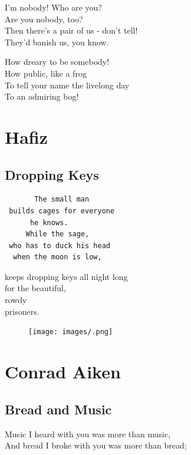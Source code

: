 \documentclass[]{book}
\renewenvironment{quote}{\begin{VF}}{\end{VF}}
\begin{document}
\begin{quote}
I'm nobody! Who are you?\\
Are you nobody, too?\\
Then there's a pair of us - don't tell!\\
They'd banish us, you know.

How dreary to be somebody!\\
How public, like a frog\\
To tell your name the livelong day\\
To an admiring bog!
\end{quote}

\chapter{Hafiz}\label{hafiz}

\section{Dropping Keys}\label{dropping-keys}

\begin{quote}
\begin{verbatim}
       The small man    
 builds cages for everyone    
      he knows.    
     While the sage,  
 who has to duck his head    
  when the moon is low,  
\end{verbatim}

keeps dropping keys all night long\\
for the beautiful,\\
rowdy\\
prisoners.
\end{quote}

\begin{figure}[htbp]
\centering
\texttt{[image: images/.png]}
\caption{}
\end{figure}

\chapter{Conrad Aiken}\label{conrad-aiken}

\section{Bread and Music}\label{bread-and-music}

\begin{quote}
Music I heard with you was more than music,\\
And bread I broke with you was more than bread;
\end{quote}
\end{document}
